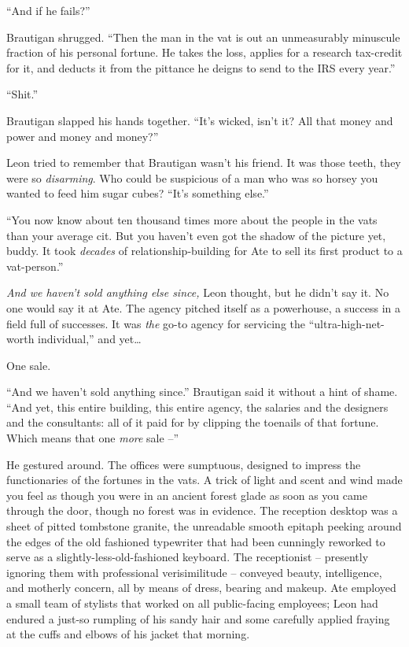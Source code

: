 “And if he fails?”

Brautigan shrugged. “Then the man in the vat is out an unmeasurably 
minuscule fraction of his personal fortune. He takes the loss, applies 
for a research tax-credit for it, and deducts it from the pittance he 
deigns to send to the IRS every year.”

“Shit.”

Brautigan slapped his hands together. “It's wicked, isn't it? All 
that money and power and money and money?”

Leon tried to remember that Brautigan wasn't his friend. It was those 
teeth, they were so \emph{disarming}. Who could be suspicious of a man 
who was so horsey you wanted to feed him sugar cubes? “It's something 
else.”

“You now know about ten thousand times more about the people in the 
vats than your average cit. But you haven't even got the shadow of the 
picture yet, buddy. It took \emph{decades} of relationship-building for 
Ate to sell its first product to a vat-person.”

\emph{And we haven't sold anything else since,} Leon thought, but he 
didn't say it. No one would say it at Ate. The agency pitched itself as 
a powerhouse, a success in a field full of successes. It was \emph{the} 
go-to agency for servicing the “ultra-high-net-worth individual,” 
and yet\ldots{}

One sale.

“And we haven't sold anything since.” Brautigan said it without a 
hint of shame. “And yet, this entire building, this entire agency, 
the salaries and the designers and the consultants: all of it paid for 
by clipping the toenails of that fortune. Which means that one 
\emph{more} sale --”

He gestured around. The offices were sumptuous, designed to impress the 
functionaries of the fortunes in the vats. A trick of light and scent 
and wind made you feel as though you were in an ancient forest glade as 
soon as you came through the door, though no forest was in evidence. 
The reception desktop was a sheet of pitted tombstone granite, the 
unreadable smooth epitaph peeking around the edges of the old fashioned 
typewriter that had been cunningly reworked to serve as a 
slightly-less-old-fashioned keyboard. The receptionist -- presently 
ignoring them with professional verisimilitude -- conveyed beauty, 
intelligence, and motherly concern, all by means of dress, bearing and 
makeup. Ate employed a small team of stylists that worked on all 
public-facing employees; Leon had endured a just-so rumpling of his 
sandy hair and some carefully applied fraying at the cuffs and elbows 
of his jacket that morning.

